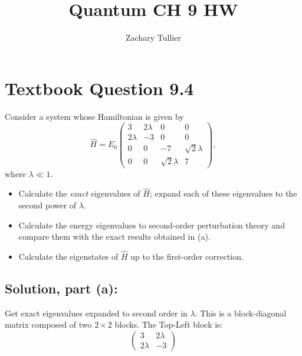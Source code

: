 \documentclass[12pt]{article}
\begin{document}
\singlespacing  %
\title{Quantum CH 9 HW}

\author[1]{Zachary Tullier}
\date{}
\maketitle

\section{Textbook Question 9.4}
    Consider a system whose Hamiltonian is given by
    \[
        \hat{H} = E_0
        \begin{pmatrix}
            3 & 2\lambda & 0 & 0 \\
            2\lambda & -3 & 0 & 0 \\
            0 & 0 & -7 & \sqrt{2}\lambda \\
            0 & 0 & \sqrt{2}\lambda & 7
        \end{pmatrix},
    \]
    where \( \lambda \ll 1 \).\\
    \begin{itemize}
        \item [(a)] Calculate the \textit{exact} eigenvalues of \( \hat{H} \); expand each of these eigenvalues to the second power of \( \lambda \).
        \item [(b)] Calculate the energy eigenvalues to second-order perturbation theory and compare them with the exact results obtained in (a).
        \item [(c)] Calculate the eigenstates of \( \hat{H} \) up to the first-order correction.
    \end{itemize}
        
    \subsection{Solution, part (a):}
        Get exact eigenvalues expanded to second order in \( \lambda \). This is a block-diagonal matrix composed of two \( 2 \times 2 \) blocks. The Top-Left block is:
        \[
            \begin{pmatrix}
                3 & 2\lambda \\
                2\lambda & -3
            \end{pmatrix}
        \]
\end{document}
